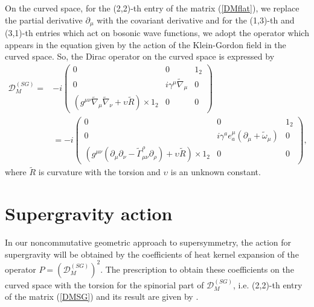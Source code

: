\documentclass{ptephy}%
\begin{document}
On the curved space, for the (2,2)-th entry of the matrix (\ref{DMflat}), we 
replace the partial derivative $\partial_\mu$ with the covariant derivative and for the (1,3)-th and (3,1)-th 
entries which act on bosonic wave functions, we adopt the operator which appears in 
the equation given by the action of the Klein-Gordon field in the curved space\cite{Fiorenzo}. 
So, the Dirac operator on the curved space 
is expressed by
\begin{align}
\mathcal{D}^{(SG)}_M = & -i
\begin{pmatrix}
0 & 0 & 1_2\\
0 & i\gamma^\mu\tilde{\nabla}_\mu & 0\\
(g^{\mu\nu}\tilde{\nabla}_\mu\tilde{\nabla}_\nu+\upsilon \tilde{R})\times 1_2 & 0 & 0
\end{pmatrix} \nonumber \\
& =
-i
\begin{pmatrix}
0 & 0 & 1_2\\
0 & i\gamma^a e_a^\mu(\partial_\mu+\tilde{\omega}_\mu) & 0\\
\left(g^{\mu\nu}(\partial_\mu\partial_\nu- \tilde{\Gamma}^\rho_{\mu\nu}\partial_\rho)
+\upsilon\tilde{R}\right)\times 1_2 & 0 & 0
\end{pmatrix}, \label{DMSG}
\end{align} 
where $\tilde{R}$ is curvature with the torsion and $\upsilon$ is an unknown constant. 
\section{Supergravity action}
In our noncommutative geometric approach to supersymmetry, the action for supergravity will be obtained 
by the coefficients of heat kernel expansion of the 
operator $P=(\mathcal{D}^{(SG)}_M)^2$\cite{gilkey}. The prescription to obtain these coefficients 
on the curved space with the torsion 
for the spinorial part of $\mathcal{D}^{(SG)}_M$, i.e. (2,2)-th entry of the matrix (\ref{DMSG})  
and its result are given by \cite{OBUKHOV}. 
\end{document}
